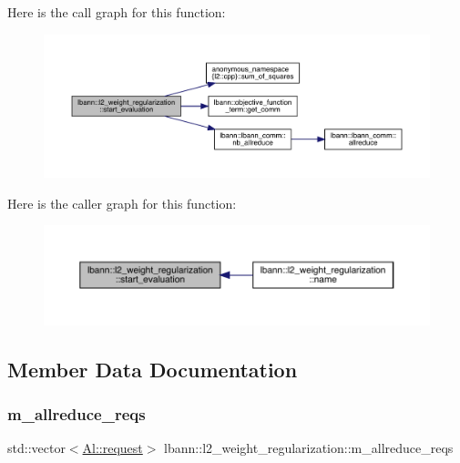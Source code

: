 Here is the call graph for this function\+:\nopagebreak
\begin{figure}[H]
\begin{center}
\leavevmode
\includegraphics[width=350pt]{classlbann_1_1l2__weight__regularization_ab3a47d8ef5b8c8e16f076659e864f683_cgraph}
\end{center}
\end{figure}
Here is the caller graph for this function\+:\nopagebreak
\begin{figure}[H]
\begin{center}
\leavevmode
\includegraphics[width=350pt]{classlbann_1_1l2__weight__regularization_ab3a47d8ef5b8c8e16f076659e864f683_icgraph}
\end{center}
\end{figure}


\subsection{Member Data Documentation}
\mbox{\label{classlbann_1_1l2__weight__regularization_adf7350e151736d9bae4aa5cf410acd80}} 
\subsubsection{\texorpdfstring{m\+\_\+allreduce\+\_\+reqs}{m\_allreduce\_reqs}}
{\footnotesize\ttfamily std\+::vector$<$\hyperlink{structlbann_1_1Al_1_1request}{Al\+::request}$>$ lbann\+::l2\+\_\+weight\+\_\+regularization\+::m\+\_\+allreduce\+\_\+reqs\hspace{0.3cm}{\ttfamily [private]}}

